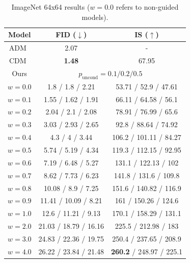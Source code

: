 \documentclass{article} %
\begin{document}
\begin{table}[!htb]
\centering\small
\begin{tabular}{c|c|c}
\toprule
Model & FID ($\downarrow$) & IS ($\uparrow$) \\
\midrule
ADM~\citep{dhariwal2021diffusion} & 2.07 & - \\
CDM~\citep{ho2021cascaded} & \textbf{1.48} & 67.95 \\
\midrule
Ours & \multicolumn{2}{c}{$p_\mathrm{uncond}=0.1/0.2/0.5$} \\
$w=0.0$  & 1.8 / 1.8 / 2.21    &    53.71 / 52.9 / 47.61 \\
$w=0.1$  & 1.55 / 1.62 / 1.91    &    66.11 / 64.58 / 56.1 \\
$w=0.2$  & 2.04 / 2.1 / 2.08    &    78.91 / 76.99 / 65.6 \\
$w=0.3$  & 3.03 / 2.93 / 2.65    &    92.8 / 88.64 / 74.92 \\
$w=0.4$  & 4.3 / 4 / 3.44    &    106.2 / 101.11 / 84.27 \\
$w=0.5$  & 5.74 / 5.19 / 4.34    &    119.3 / 112.15 / 92.95 \\
$w=0.6$  & 7.19 / 6.48 / 5.27    &    131.1 / 122.13 / 102 \\
$w=0.7$  & 8.62 / 7.73 / 6.23    &    141.8 / 131.6 / 109.8 \\
$w=0.8$  & 10.08 / 8.9 / 7.25    &    151.6 / 140.82 / 116.9 \\
$w=0.9$  & 11.41 / 10.09 / 8.21    &    161 / 150.26 / 124.6 \\
$w=1.0$  & 12.6 / 11.21 / 9.13    &    170.1 / 158.29 / 131.1 \\
$w=2.0$  & 21.03 / 18.79 / 16.16    &    225.5 / 212.98 / 183 \\
$w=3.0$  & 24.83 / 22.36 / 19.75    &    250.4 / 237.65 / 208.9 \\
$w=4.0$  & 26.22 / 23.84 / 21.48    &    \textbf{260.2} / 248.97 / 225.1 \\
\bottomrule
\end{tabular}
\caption{ImageNet 64x64 results ($w=0.0$ refers to non-guided models).}
\label{table:i64}
\end{table}
\end{document}

